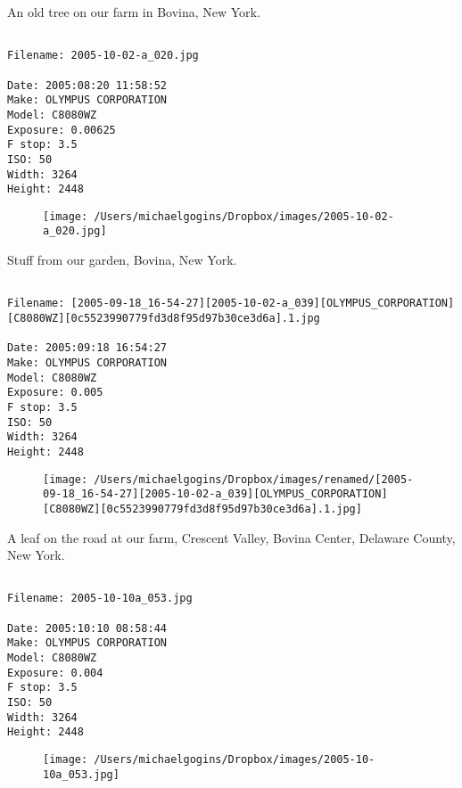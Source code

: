 \clearpage
\onecolumn
\noindent An old tree on our farm in Bovina, New York.
\noindent
\begin{lstlisting}

Filename: 2005-10-02-a_020.jpg

Date: 2005:08:20 11:58:52
Make: OLYMPUS CORPORATION
Model: C8080WZ
Exposure: 0.00625
F stop: 3.5
ISO: 50
Width: 3264
Height: 2448
\end{lstlisting}
\clearpage

\begin{figure}
\texttt{[image: /Users/michaelgogins/Dropbox/images/2005-10-02-a\_020.jpg]}
\end{figure}
    
\clearpage
\onecolumn
\noindent Stuff from our garden, Bovina, New York.
\noindent
\begin{lstlisting}

Filename: [2005-09-18_16-54-27][2005-10-02-a_039][OLYMPUS_CORPORATION][C8080WZ][0c5523990779fd3d8f95d97b30ce3d6a].1.jpg

Date: 2005:09:18 16:54:27
Make: OLYMPUS CORPORATION
Model: C8080WZ
Exposure: 0.005
F stop: 3.5
ISO: 50
Width: 3264
Height: 2448
\end{lstlisting}
\clearpage

\begin{figure}
\texttt{[image: /Users/michaelgogins/Dropbox/images/renamed/[2005-09-18\_16-54-27][2005-10-02-a\_039][OLYMPUS\_CORPORATION][C8080WZ][0c5523990779fd3d8f95d97b30ce3d6a].1.jpg]}
\end{figure}
    
\clearpage
\onecolumn
\noindent A leaf on the road at our farm, Crescent Valley, Bovina Center, Delaware County, New York.
\noindent
\begin{lstlisting}

Filename: 2005-10-10a_053.jpg

Date: 2005:10:10 08:58:44
Make: OLYMPUS CORPORATION
Model: C8080WZ
Exposure: 0.004
F stop: 3.5
ISO: 50
Width: 3264
Height: 2448
\end{lstlisting}
\clearpage

\begin{figure}
\texttt{[image: /Users/michaelgogins/Dropbox/images/2005-10-10a\_053.jpg]}
\end{figure}
    
